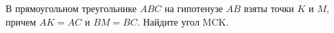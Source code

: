 \begin{ex}
	\begin{condition}
		В прямоугольном треугольнике \( ABC  \) на гипотенузе \( AB  \) взяты точки \( K  \) и \( M  \), причем \( AK = AC  \) и \( BM = BC \).
		Найдите угол MCK.
	\end{condition}
\end{ex}